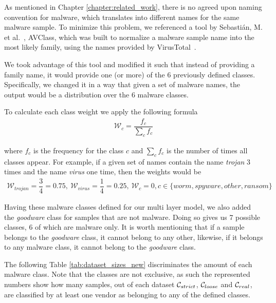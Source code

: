 As mentioned in Chapter \ref{chapter:related_work}, there is no agreed upon naming convention for malware, which translates into different names for the same malware sample.
To minimize this problem, we referenced a tool by Sebastián, M. et al.~\cite{sebastian2016avclass}, AVClass, which was built to normalize a malware sample name into the most likely family, using the names provided by VirusTotal~\cite{tool:virustotal}.

We took advantage of this tool and modified it such that instead of providing a family name, it would provide one (or more) of the 6 previously defined classes.
Specifically, we changed it in a way that given a set of malware names, the output would be a distribution over the 6 malware classes.

To calculate each class weight we apply the following formula
\begin{eqnarray*}
	\mathcal{W}_c = \dfrac{f_c}{\sum\limits_{c}f_c}
\end{eqnarray*}

where $f_c$ is the frequency for the class $c$ and $\sum_{c}f_c$ is the number of times all classes appear.
For example, if a given set of names contain the name \textit{trojan} 3 times and the name \textit{virus} one time, then the weights would be
\begin{eqnarray*}
	\mathcal{W}_{trojan}=\dfrac{3}{4}=0.75,~\mathcal{W}_{virus}=\dfrac{1}{4}=0.25,~ \mathcal{W}_{c}=0, c \in \{worm, spyware, other, ransom\}
\end{eqnarray*}

\medskip

Having these malware classes defined for our multi layer model, we also added the \textit{goodware} class for samples that are not malware.
Doing so gives us 7 possible classes, 6 of which are malware only.
It is worth mentioning that if a sample belongs to the \textit{goodware} class, it cannot belong to any other, likewise, if it belongs to any malware class, it cannot belong to the \textit{goodware} class.

The following Table \ref{tab:dataset_sizes_new} discriminates the amount of each malware class.
Note that the classes are not exclusive, as such the represented numbers show how many samples, out of each dataset $\mathcal{C}_{strict}$, $\mathcal{C}_{loose}$ and $\mathcal{C}_{real}$, are classified by at least one vendor as belonging to any of the defined classes.

